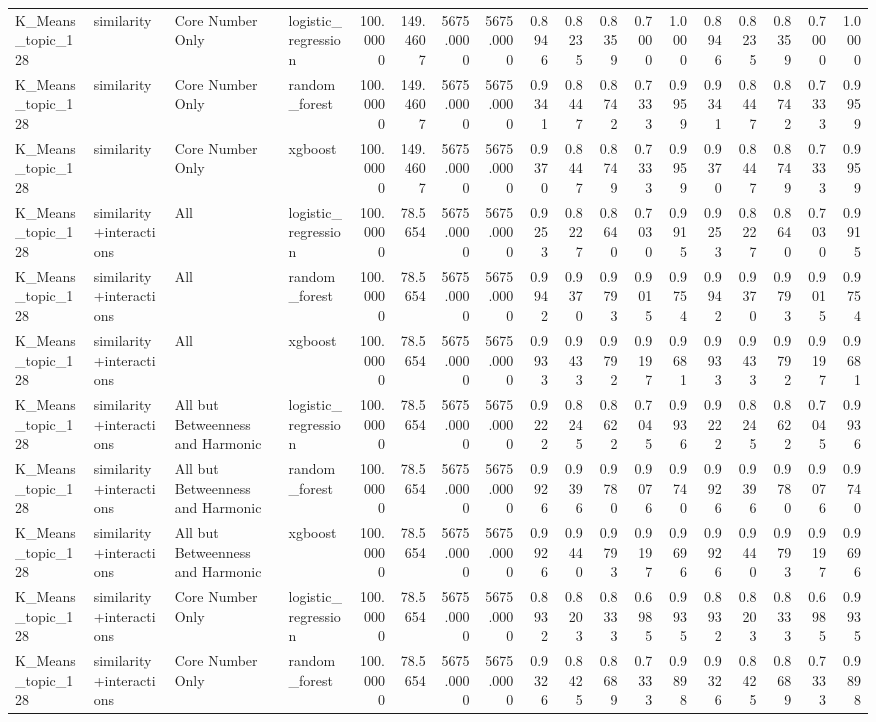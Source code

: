 \begin{tabular}{llllrrrrrrrrrrrrrr}
K_Means_topic_128 & similarity & Core Number Only & logistic_regression & 100.0000 & 149.4607 & 5675.0000 & 5675.0000 & 0.8946 & 0.8235 & 0.8359 & 0.7000 & 1.0000 & 0.8946 & 0.8235 & 0.8359 & 0.7000 & 1.0000 \\
K_Means_topic_128 & similarity & Core Number Only & random_forest & 100.0000 & 149.4607 & 5675.0000 & 5675.0000 & 0.9341 & 0.8447 & 0.8742 & 0.7333 & 0.9959 & 0.9341 & 0.8447 & 0.8742 & 0.7333 & 0.9959 \\
K_Means_topic_128 & similarity & Core Number Only & xgboost & 100.0000 & 149.4607 & 5675.0000 & 5675.0000 & 0.9370 & 0.8447 & 0.8749 & 0.7333 & 0.9959 & 0.9370 & 0.8447 & 0.8749 & 0.7333 & 0.9959 \\
K_Means_topic_128 & similarity+interactions & All & logistic_regression & 100.0000 & 78.5654 & 5675.0000 & 5675.0000 & 0.9253 & 0.8227 & 0.8640 & 0.7030 & 0.9915 & 0.9253 & 0.8227 & 0.8640 & 0.7030 & 0.9915 \\
K_Means_topic_128 & similarity+interactions & All & random_forest & 100.0000 & 78.5654 & 5675.0000 & 5675.0000 & 0.9942 & 0.9370 & 0.9793 & 0.9015 & 0.9754 & 0.9942 & 0.9370 & 0.9793 & 0.9015 & 0.9754 \\
K_Means_topic_128 & similarity+interactions & All & xgboost & 100.0000 & 78.5654 & 5675.0000 & 5675.0000 & 0.9933 & 0.9433 & 0.9792 & 0.9197 & 0.9681 & 0.9933 & 0.9433 & 0.9792 & 0.9197 & 0.9681 \\
K_Means_topic_128 & similarity+interactions & All but Betweenness and Harmonic & logistic_regression & 100.0000 & 78.5654 & 5675.0000 & 5675.0000 & 0.9222 & 0.8245 & 0.8622 & 0.7045 & 0.9936 & 0.9222 & 0.8245 & 0.8622 & 0.7045 & 0.9936 \\
K_Means_topic_128 & similarity+interactions & All but Betweenness and Harmonic & random_forest & 100.0000 & 78.5654 & 5675.0000 & 5675.0000 & 0.9926 & 0.9396 & 0.9780 & 0.9076 & 0.9740 & 0.9926 & 0.9396 & 0.9780 & 0.9076 & 0.9740 \\
K_Means_topic_128 & similarity+interactions & All but Betweenness and Harmonic & xgboost & 100.0000 & 78.5654 & 5675.0000 & 5675.0000 & 0.9926 & 0.9440 & 0.9793 & 0.9197 & 0.9696 & 0.9926 & 0.9440 & 0.9793 & 0.9197 & 0.9696 \\
K_Means_topic_128 & similarity+interactions & Core Number Only & logistic_regression & 100.0000 & 78.5654 & 5675.0000 & 5675.0000 & 0.8932 & 0.8203 & 0.8333 & 0.6985 & 0.9935 & 0.8932 & 0.8203 & 0.8333 & 0.6985 & 0.9935 \\
K_Means_topic_128 & similarity+interactions & Core Number Only & random_forest & 100.0000 & 78.5654 & 5675.0000 & 5675.0000 & 0.9326 & 0.8425 & 0.8689 & 0.7333 & 0.9898 & 0.9326 & 0.8425 & 0.8689 & 0.7333 & 0.9898 \\

\end{tabular}
